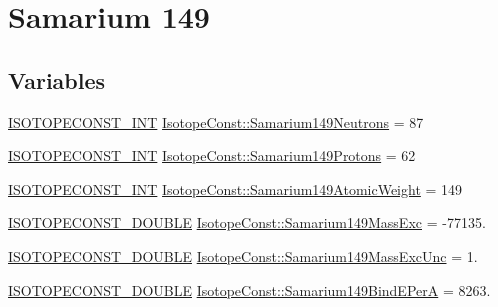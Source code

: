 \hypertarget{group___isotope_const-_samarium-_sm149}{}\section{Samarium 149}
\label{group___isotope_const-_samarium-_sm149}
\subsection*{Variables}
\begin{DoxyCompactItemize}
\item 
\mbox{\hyperlink{group___isotope_const-_macros_ga5f18360b3e99483a35c32d789e62621c}{I\+S\+O\+T\+O\+P\+E\+C\+O\+N\+S\+T\+\_\+\+I\+NT}} \mbox{\hyperlink{group___isotope_const-_samarium-_sm149_gae3e0f6046e2276d7cdec9319f8175d47}{Isotope\+Const\+::\+Samarium149\+Neutrons}} = 87
\item 
\mbox{\hyperlink{group___isotope_const-_macros_ga5f18360b3e99483a35c32d789e62621c}{I\+S\+O\+T\+O\+P\+E\+C\+O\+N\+S\+T\+\_\+\+I\+NT}} \mbox{\hyperlink{group___isotope_const-_samarium-_sm149_ga0e139df0e6084a6fe61961d01c0af4f3}{Isotope\+Const\+::\+Samarium149\+Protons}} = 62
\item 
\mbox{\hyperlink{group___isotope_const-_macros_ga5f18360b3e99483a35c32d789e62621c}{I\+S\+O\+T\+O\+P\+E\+C\+O\+N\+S\+T\+\_\+\+I\+NT}} \mbox{\hyperlink{group___isotope_const-_samarium-_sm149_ga05afbaa11258a97e438d202259dc356f}{Isotope\+Const\+::\+Samarium149\+Atomic\+Weight}} = 149
\item 
\mbox{\hyperlink{group___isotope_const-_macros_ga8f45a7272ce02c0b4c65c44636ed719a}{I\+S\+O\+T\+O\+P\+E\+C\+O\+N\+S\+T\+\_\+\+D\+O\+U\+B\+LE}} \mbox{\hyperlink{group___isotope_const-_samarium-_sm149_ga61ee3b3dbe5b0d4c086078b143ebe007}{Isotope\+Const\+::\+Samarium149\+Mass\+Exc}} = -\/77135.
\item 
\mbox{\hyperlink{group___isotope_const-_macros_ga8f45a7272ce02c0b4c65c44636ed719a}{I\+S\+O\+T\+O\+P\+E\+C\+O\+N\+S\+T\+\_\+\+D\+O\+U\+B\+LE}} \mbox{\hyperlink{group___isotope_const-_samarium-_sm149_ga960393fc426656479d388f97e8a6b639}{Isotope\+Const\+::\+Samarium149\+Mass\+Exc\+Unc}} = 1.
\item 
\mbox{\hyperlink{group___isotope_const-_macros_ga8f45a7272ce02c0b4c65c44636ed719a}{I\+S\+O\+T\+O\+P\+E\+C\+O\+N\+S\+T\+\_\+\+D\+O\+U\+B\+LE}} \mbox{\hyperlink{group___isotope_const-_samarium-_sm149_gabfe6fca21aa14943d70adbf2bac009cf}{Isotope\+Const\+::\+Samarium149\+Bind\+E\+PerA}} = 8263.
\item 

\end{DoxyCompactItemize}

